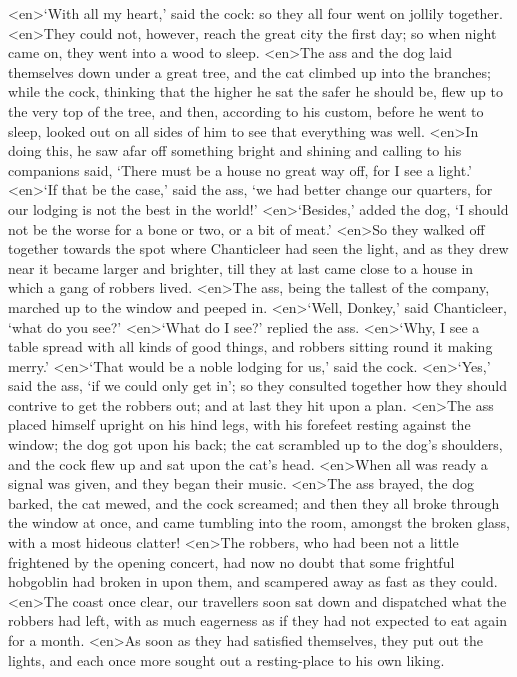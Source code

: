 <en>‘With all my heart,’ said the cock: so they all four went on jollily together.
<en>They could not, however, reach the great city the first day; so when night came on, they went into a wood to sleep.
<en>The ass and the dog laid themselves down under a great tree, and the cat climbed up into the branches; while the cock, thinking that the higher he sat the safer he should be, flew up to the very top of the tree, and then, according to his custom, before he went to sleep, looked out on all sides of him to see that everything was well.
<en>In doing this, he saw afar off something bright and shining and calling to his companions said, ‘There must be a house no great way off, for I see a light.’ 
<en>‘If that be the case,’ said the ass, ‘we had better change our quarters, for our lodging is not the best in the world!’ 
<en>‘Besides,’ added the dog, ‘I should not be the worse for a bone or two, or a bit of meat.’ 
<en>So they walked off together towards the spot where Chanticleer had seen the light, and as they drew near it became larger and brighter, till they at last came close to a house in which a gang of robbers lived.
<en>The ass, being the tallest of the company, marched up to the window and peeped in.
<en>‘Well, Donkey,’ said Chanticleer, ‘what do you see?’ 
<en>‘What do I see?’ replied the ass.
<en>‘Why, I see a table spread with all kinds of good things, and robbers sitting round it making merry.’ 
<en>‘That would be a noble lodging for us,’ said the cock.
<en>‘Yes,’ said the ass, ‘if we could only get in’; so they consulted together how they should contrive to get the robbers out; and at last they hit upon a plan.
<en>The ass placed himself upright on his hind legs, with his forefeet resting against the window; the dog got upon his back; the cat scrambled up to the dog’s shoulders, and the cock flew up and sat upon the cat’s head.
<en>When all was ready a signal was given, and they began their music.
<en>The ass brayed, the dog barked, the cat mewed, and the cock screamed; and then they all broke through the window at once, and came tumbling into the room, amongst the broken glass, with a most hideous clatter!
<en>The robbers, who had been not a little frightened by the opening concert, had now no doubt that some frightful hobgoblin had broken in upon them, and scampered away as fast as they could.
<en>The coast once clear, our travellers soon sat down and dispatched what the robbers had left, with as much eagerness as if they had not expected to eat again for a month.
<en>As soon as they had satisfied themselves, they put out the lights, and each once more sought out a resting-place to his own liking.
